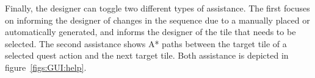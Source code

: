 Finally, the designer can toggle two different types of assistance. The first focuses on informing the designer of changes in the sequence due to a manually placed or automatically generated, and informs the designer of the tile that needs to be selected. The second assistance shows A* paths between the target tile of a selected quest action and the next target tile. Both assistance is depicted in figure~\ref{figs:GUI:help}.



  





